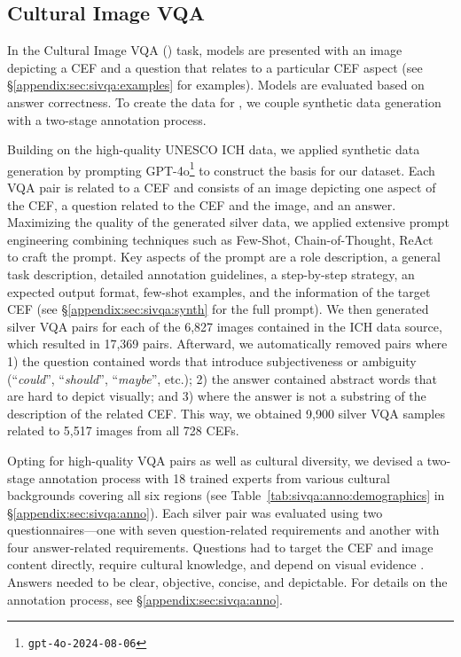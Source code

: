 \subsection{Cultural Image VQA}
\label{sec:sivqa}
%
In the Cultural Image VQA (\sivqa) task, models are presented with an image depicting a CEF and a question that relates to a particular CEF aspect (see \S\ref{appendix:sec:sivqa:examples} for examples).
%
Models are evaluated based on answer correctness.
%
To create the data for \sivqa, we couple synthetic data generation with a two-stage annotation process.
%

\label{sec:sivqa:collection}
%
Building on the high-quality UNESCO ICH data, we applied synthetic data generation by prompting GPT-4o\footnote{\texttt{gpt-4o-2024-08-06}} to construct the basis for our dataset.%
%
Each VQA pair is related to a CEF and consists of an image depicting one aspect of the CEF, a question related to the CEF and the image, and an answer.
%
Maximizing the quality of the generated silver data, we applied extensive prompt engineering combining techniques such as Few-Shot, Chain-of-Thought, ReAct~\cite{wei2022cot,zhang2023autocot,zheng2024react,sahoo2024promptsurvey} to craft the prompt.
%
Key aspects of the prompt are a role description, a general task description, detailed annotation guidelines, a step-by-step strategy, an expected output format, few-shot examples, and the information of the target CEF (see \S\ref{appendix:sec:sivqa:synth} for the full prompt).
%
We then generated silver VQA pairs for each of the 6,827 images contained in the ICH data source, which resulted in 17,369 pairs.
%
Afterward, we automatically removed pairs where 1) the question contained words that introduce subjectiveness or ambiguity (``\textit{could}'', ``\textit{should}'', ``\textit{maybe}'', etc.); 2) the answer contained abstract words that are hard to depict visually; and 3) where the answer is not a substring of the description of the related CEF.
%
This way, we obtained 9,900 silver VQA samples related to 5,517 images from all 728 CEFs.
%

\label{sec:sivqa:collection:annotation}
%
Opting for high-quality VQA pairs as well as cultural diversity, we devised a two-stage annotation process with 18 trained experts from various cultural backgrounds covering all six regions (see Table~\ref{tab:sivqa:anno:demographics} in \S\ref{appendix:sec:sivqa:anno}).
%
Each silver pair was evaluated using two questionnaires---one with seven question-related requirements and another with four answer-related requirements.
%
Questions had to target the CEF and image content directly, require cultural knowledge, and depend on visual evidence \cite{chen2024mmstar}.
%
Answers needed to be clear, objective, concise, and depictable.
%
For details on the annotation process, see \S\ref{appendix:sec:sivqa:anno}.
%

